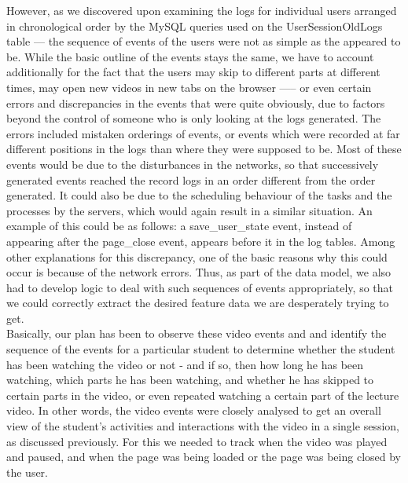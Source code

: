 \documentclass[16pt]{report}
\begin{document}
However, as we discovered upon examining the logs for individual users arranged in chronological order by the MySQL queries used on the UserSessionOldLogs table --- the sequence of events of the users were not as simple as the appeared to be. While the basic outline of the events stays the same, we have to account additionally for the fact that the users may skip to different parts at different times, may open new videos in new tabs on the browser ----- or even certain errors and discrepancies in the events that were quite obviously, due to factors beyond the control of someone who is only looking at the logs generated. The errors included mistaken orderings of events, or events which were recorded at far different positions in the logs than where they were supposed to be. Most of these events would be due to the disturbances in the networks, so that successively generated events reached the record logs in an order different from the order generated. It could also be due to the scheduling behaviour of the tasks and the processes by the servers, which would again result in a similar situation. An example of this could be as follows: a save\_user\_state event, instead of appearing after the page\_close event, appears before it in the log tables. Among other explanations for this discrepancy, one of the basic reasons why this could occur is because of the network errors. Thus, as part of the data model, we also had to develop logic to deal with such sequences of events appropriately, so that we could correctly extract the desired feature data we are desperately trying to get.\\

Basically, our plan has been to observe these video events and and identify the sequence of the events for a particular student to determine whether the student has been watching the video or not - and if so, then how long he has been watching, which parts he has been watching, and whether he has skipped to certain parts in the video, or even repeated watching a certain part of the lecture video. In other words, the video events were closely analysed to get an overall view of the student's activities and interactions with the video in a single session, as discussed previously. For this we needed to track when the video was played and paused, and when the page was being loaded or the page was being closed by the user. \\
\end{document}
